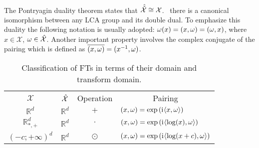\paragraph{}
The Pontryagin duality theorem states that $\hat{\hat{\mathcal{X}}}\cong \mathcal{X}$. \Ie~there is a canonical isomorphism between any \acs{LCA} group and its double dual. To emphasize this duality the following notation is usually adopted: $\omega(x)=(x,\omega)=(\omega,x)$, where $x\in\mathcal{X}$, $\omega\in\hat{\mathcal{X}}$. Another important property involves the complex conjugate of the pairing which is defined as $\overline{(x,\omega)} = ({x}^{-1},\omega)$.
\begin{table}[!ht]\label{table:pairings}
\caption{Classification of \acl{FT}s in terms of their domain and transform domain.}
\label{tab:dual_and_pairing}
\centering
\begin{tabularx}{\textwidth}{cccX}
\toprule
\multicolumn{1}{c}{$\mathcal{X}$} & \multicolumn{1}{c}{$\hat{\mathcal{X}}$} & \multicolumn{1}{c}{Operation} & \multicolumn{1}{c}{Pairing} \\
\cmidrule{1-4}
$\mathbb{R}^d$ & $\mathbb{R}^d$ & $+$ & $(x,\omega) = \exp\left({\mathrm{i}\mkern1mu} \langle x, \omega\rangle\right)$ \\
$\mathbb{R}^d_{*,+}$ & $\mathbb{R}^d$ & $\cdot$ & $(x,\omega) =\exp\left( {\mathrm{i}\mkern1mu} \langle\log(x), \omega\rangle \right)$ \\
$(-c;+\infty)^d$ & $\mathbb{R}^d$ & $\odot$ & $(x,\omega) =\exp\left( {\mathrm{i}\mkern1mu} \langle\log(x+c), \omega\rangle \right)$ \\
\bottomrule
\end{tabularx}
\end{table}
